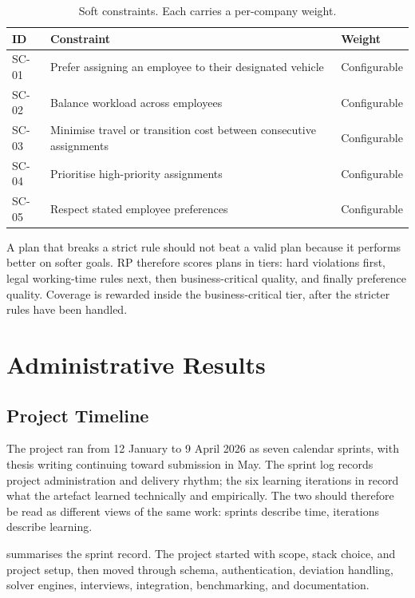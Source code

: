 \begin{table}[h]
\centering
\caption{Soft constraints. Each carries a per-company weight.}
\label{tab:soft-constraints}
\small
\begin{tabularx}{\textwidth}{@{}
  p{}
  X
  p{}
@{}}
\toprule
\textbf{ID} & \textbf{Constraint} & \textbf{Weight} \\
\midrule
SC-01 & Prefer assigning an employee to their designated vehicle & Configurable \\
SC-02 & Balance workload across employees & Configurable \\
SC-03 & Minimise travel or transition cost between consecutive assignments & Configurable \\
SC-04 & Prioritise high-priority assignments & Configurable \\
SC-05 & Respect stated employee preferences & Configurable \\
\bottomrule
\end{tabularx}
\end{table}

A plan that breaks a strict rule should not beat a valid plan because it performs better on softer goals. RP therefore scores plans in tiers: hard violations first, legal working-time rules next, then business-critical quality, and finally preference quality. Coverage is rewarded inside the business-critical tier, after the stricter rules have been handled.

\section{Administrative Results}
\label{sec:administrative-results}

\subsection{Project Timeline}
\label{sec:sprint-summary}

The project ran from 12 January to 9 April 2026 as seven calendar sprints, with thesis writing continuing toward submission in May. The sprint log records project administration and delivery rhythm; the six learning iterations in  record what the artefact learned technically and empirically. The two should therefore be read as different views of the same work: sprints describe time, iterations describe learning.

 summarises the sprint record. The project started with scope, stack choice, and project setup, then moved through schema, authentication, deviation handling, solver engines, interviews, integration, benchmarking, and documentation.

